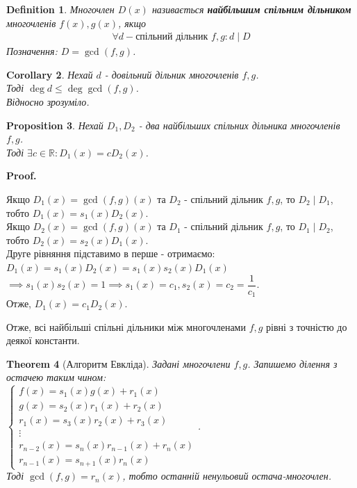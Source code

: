 \documentclass[a4paper, 10pt]{extarticle}
\makeatletter
\def\qed{$\blacksquare$}
\def\qed{$\blacksquare$}
\theoremstyle{theoremdd}
\newtheorem{theorem}{Theorem}[subsection]
\theoremstyle{theoremdd}
\newtheorem{definition}[theorem]{Definition}
\theoremstyle{theoremdd}
\theoremstyle{theoremdd}
\theoremstyle{theoremdd}
\newtheorem{proposition}[theorem]{Proposition}
\theoremstyle{theoremdd}
\theoremstyle{theoremdd}
\theoremstyle{theoremdd}
\newtheorem{corollary}[theorem]{Corollary}
\renewenvironment{proof}[1][Proof.\\]{\par
\pushQED{\hfill \qed}%
\normalfont \topsep6\p@\@plus6\p@\relax
\trivlist
\item\relax
{\bfseries
#1\@addpunct{.}}\hspace\labelsep\ignorespaces
}{%
\popQED\endtrivlist\@endpefalse
}
\makeatother
\begin{document}
\begin{definition}
Многочлен $D(x)$ називається \textbf{найбільшим спільним дільником} многочленів $f(x),g(x)$, якщо
\begin{align*}
\forall d - \text{спільний дільник }f,g: d \mid D
\end{align*}
Позначення: $D = \gcd(f,g)$.
\end{definition}

\begin{corollary}
Нехай $d$ - довільний дільник многочленів $f,g$.\\
Тоді $\deg d \leq \deg \gcd(f,g)$.\\
\textit{Відносно зрозуміло.}
\end{corollary}

\begin{proposition}
Нехай $D_1, D_2$ - два найбільших спільних дільника многочленів $f,g$.\\
Тоді $\exists c \in \mathbb{R}: D_1(x) = c D_2(x)$.
\end{proposition}

\begin{proof}
Якщо $D_1(x) = \gcd(f,g) (x)$ та $D_2$ - спільний дільник $f,g$, то $D_2 \mid D_1$, тобто $D_1(x) = s_1(x) D_2(x)$.\\
Якщо $D_2(x) = \gcd(f,g) (x)$ та $D_1$ - спільний дільник $f,g$, то $D_1 \mid D_2$, тобто $D_2(x) = s_2(x) D_1(x)$.\\
Друге рівняння підставимо в перше - отримаємо:\\
$D_1(x) = s_1(x) D_2(x) = s_1(x)s_2(x)D_1(x)$\\
$\implies s_1(x)s_2(x) = 1 \implies s_1(x) = c_1, s_2(x) = c_2 = \dfrac{1}{c_1}$.\\
Отже, $D_1(x) = c_1 D_2(x)$.
\end{proof}

Отже, всі найбільші спільні дільники між многочленами $f,g$ рівні з точністю до деякої константи.

\begin{theorem}[Алгоритм Евкліда]
Задані многочлени $f,g$. Запишемо ділення з остачею таким чином:\\
$\begin{cases}
f(x) = s_1(x) g(x) + r_1(x) \\
g(x) = s_2(x) r_1(x) + r_2(x) \\
r_1(x) = s_3(x) r_2(x) + r_3(x) \\
\vdots \\
r_{n-2}(x) = s_n(x)r_{n-1}(x) + r_n(x) \\
r_{n-1}(x) = s_{n+1}(x) r_n(x)
\end{cases}$.\\
Тоді $\gcd(f,g) = r_n(x)$, тобто останній ненульовий остача-многочлен.
\end{theorem}
\end{document}
